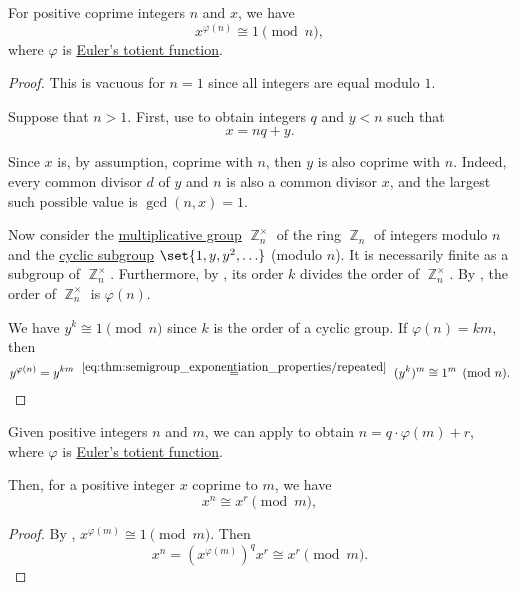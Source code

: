 \begin{theorem}\label{thm:eulers_totient_theorem}
  For positive coprime integers \( n \) and \( x \), we have
  \begin{equation*}
    x^{\varphi(n)} \cong 1 \pmod n,
  \end{equation*}
  where \( \varphi \) is \hyperref[def:eulers_totient_function]{Euler's totient function}.
\end{theorem}
\begin{proof}
  This is vacuous for \( n = 1 \) since all integers are equal modulo \( 1 \).

  Suppose that \( n > 1 \). First, use  to obtain integers \( q \) and \( y < n \) such that
  \begin{equation*}
    x = nq + y.
  \end{equation*}

  Since \( x \) is, by assumption, coprime with \( n \), then \( y \) is also coprime with \( n \). Indeed, every common divisor \( d \) of \( y \) and \( n \) is also a common divisor \( x \), and the largest such possible value is \( \gcd(n, x) = 1 \).

  Now consider the \hyperref[def:semiring]{multiplicative group} \( \BbbZ_n^\times \) of the ring \hyperref[def:ring_of_integers_modulo]{\( \BbbZ_n \)} of integers modulo \( n \) and the \hyperref[def:cyclic_group]{cyclic subgroup} \( \set{ 1, y, y^2, \ldots } \) (modulo \( n \)). It is necessarily finite as a subgroup of \( \BbbZ_n^\times \). Furthermore, by , its order \( k \) divides the order of \( \BbbZ_n^\times \). By , the order of \( \BbbZ_n^\times \) is \( \varphi(n) \).

  We have \( y^k \cong 1 \pmod n \) since \( k \) is the order of a cyclic group. If \( \varphi(n) = km \), then
  \begin{equation*}
    y^{\varphi(n)}
    =
    y^{km}
    \reloset {\eqref{eq:thm:semigroup_exponentiation_properties/repeated}} =
    (y^k)^m
    \cong
    1^m
    \pmod n.
  \end{equation*}
\end{proof}

\begin{corollary}\label{thm:division_modulo}
  Given positive integers \( n \) and \( m \), we can apply  to obtain \( n = q \cdot \varphi(m) + r \), where \( \varphi \) is \hyperref[def:eulers_totient_function]{Euler's totient function}.

  Then, for a positive integer \( x \) coprime to \( m \), we have
  \begin{equation*}
    x^n \cong x^r \pmod m,
  \end{equation*}
\end{corollary}
\begin{proof}
  By , \( x^{\varphi(m)} \cong 1 \pmod m \). Then
  \begin{equation*}
    x^n = (x^{\varphi(m)})^q x^r \cong x^r \pmod m.
  \end{equation*}
\end{proof}

